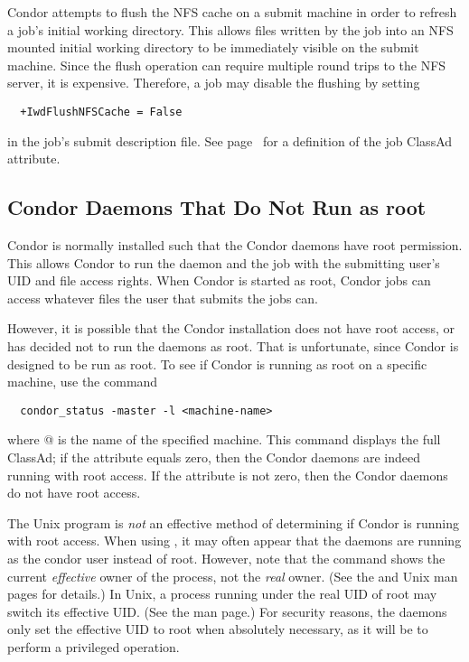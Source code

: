 Condor attempts to flush the NFS cache on a submit machine in order to
refresh a job's initial working directory.
This allows files written by the job into an NFS mounted 
initial working directory to be immediately visible on the submit machine.
Since the flush operation can require multiple round trips
to the NFS server, it is expensive.
Therefore, a job may disable the flushing by setting
\begin{verbatim}
  +IwdFlushNFSCache = False
\end{verbatim}
in the job's submit description file.
See page~\pageref{IwdFlushNFSCache-job-attribute} for a definition
of the job ClassAd attribute.

\subsection{Condor Daemons That Do Not Run as root}

Condor is normally installed such that the Condor daemons have root
permission.
This allows Condor to run the  
daemon and
the job with the submitting user's UID and file access rights.
When Condor
is started as root, Condor jobs can access whatever files the
user that submits the jobs can.

However, it is possible that the Condor installation 
does not have root access, or
has decided not to run the daemons as root.
That is unfortunate,
since Condor is designed to be run as root.
To see if Condor is
running as root on a specific machine, use the command
\begin{verbatim}
  condor_status -master -l <machine-name>
\end{verbatim}

where @ is the name of the specified machine.
This command displays the full  ClassAd; if the
attribute  equals zero,
then the Condor daemons are indeed
running with root access.  If the
 attribute is not zero, then the Condor daemons do not have
root access.

\Note The Unix program 
is \emph{not} an effective
method of determining if Condor is running with root access.
When using ,
it may often appear that the daemons are
running as the condor user instead of root.
However, note that the 
command shows the current \emph{effective} owner of the
process, not the \emph{real} owner.  (See the  and
 Unix man pages for details.)  In Unix, a process
running under the real UID of root may switch its effective UID.
(See the  man page.)
For security reasons, the daemons
only set the effective UID to root when absolutely necessary,
as it will be to perform a privileged operation.

